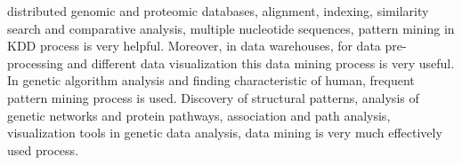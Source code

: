 \documentclass[conference]{IEEEtran}
\begin{document}
distributed genomic and proteomic databases, alignment, indexing, similarity search and comparative analysis, multiple nucleotide sequences, pattern mining in KDD process is very helpful. Moreover, in data warehouses, for data pre-processing and different data visualization this data mining process is very useful. In genetic algorithm analysis and finding characteristic of human, frequent pattern mining process is used. Discovery of structural patterns, analysis of genetic networks and protein pathways, association and path analysis, visualization tools in genetic data analysis, data mining is very much effectively used process.
\end{document}
